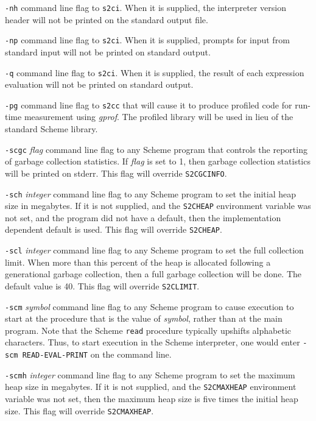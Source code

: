 \documentclass[10pt,twocolumn]{article}
\begin{document}
\texttt{-nh} command line flag to \texttt{s2ci}.  When it is supplied,
the interpreter version header will not be printed on the standard
output file.

\texttt{-np} command line flag to \texttt{s2ci}.  When it is supplied,
prompts for input from standard input will not be printed on standard
output.

\texttt{-q} command line flag to \texttt{s2ci}.  When it is supplied,
the result of each expression evaluation will not be printed on
standard output.

\texttt{-pg} command line flag to \texttt{s2cc} that will cause it to
produce profiled code for run-time measurement using \emph{gprof}.
The profiled library will be used in lieu of the standard Scheme
library.

\texttt{-scgc} \emph{flag} command line flag to any Scheme program
that controls the reporting of garbage collection statistics.  If
\emph{flag} is set to 1, then garbage collection statistics will be
printed on stderr.  This flag will override \texttt{S2CGCINFO}.

\texttt{-sch} \emph{integer} command line flag to any Scheme program
to set the initial heap size in megabytes.  If it is not supplied, and
the \texttt{S2CHEAP} environment variable was not set, and the program
did not have a default, then the implementation dependent default is
used.  This flag will override \texttt{S2CHEAP}.

\texttt{-scl} \emph{integer} command line flag to any Scheme program
to set the full collection limit.  When more than this percent of the
heap is allocated following a generational garbage collection, then a
full garbage collection will be done.  The default value is 40.  This
flag will override \texttt{S2CLIMIT}.

\texttt{-scm} \emph{symbol} command line flag to any Scheme program to
cause execution to start at the procedure that is the value of
\emph{symbol}, rather than at the main program.  Note that the Scheme
\texttt{read} procedure typically upshifts alphabetic characters.
Thus, to start execution in the Scheme interpreter, one would enter
\texttt{-scm READ-EVAL-PRINT} on the command line.

\texttt{-scmh} \emph{integer} command line flag to any Scheme program
to set the maximum heap size in megabytes.  If it is not supplied, and
the \texttt{S2CMAXHEAP} environment variable was not set, then the
maximum heap size is five times the initial heap size. This flag will
override \texttt{S2CMAXHEAP}.
\end{document}
